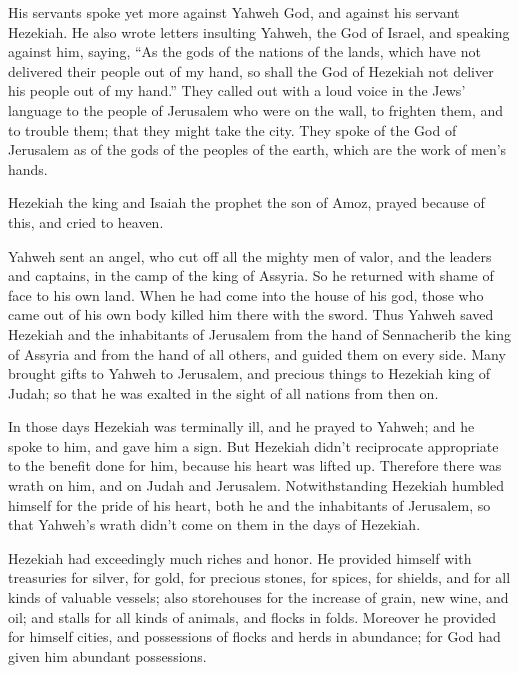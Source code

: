 {\par }{\PP {}His servants spoke yet more against Yahweh God, and against his servant Hezekiah.
He also wrote letters insulting Yahweh, the God of Israel, and speaking against him, saying, “As the gods of the nations of the lands, which have not delivered their people out of my hand, so shall the God of Hezekiah not deliver his people out of my hand.”
They called out with a loud voice in the Jews’ language to the people of Jerusalem who were on the wall, to frighten them, and to trouble them; that they might take the city.
They spoke of the God of Jerusalem as of the gods of the peoples of the earth, which are the work of men’s hands.
\par }{\PP {}Hezekiah the king and Isaiah the prophet the son of Amoz, prayed because of this, and cried to heaven.
\par }{\PP {}Yahweh sent an angel, who cut off all the mighty men of valor, and the leaders and captains, in the camp of the king of Assyria. So he returned with shame of face to his own land. When he had come into the house of his god, those who came out of his own body killed him there with the sword.
Thus Yahweh saved Hezekiah and the inhabitants of Jerusalem from the hand of Sennacherib the king of Assyria and from the hand of all others, and guided them on every side.
Many brought gifts to Yahweh to Jerusalem, and precious things to Hezekiah king of Judah; so that he was exalted in the sight of all nations from then on.
\par }{\PP {}In those days Hezekiah was terminally ill, and he prayed to Yahweh; and he spoke to him, and gave him a sign.
But Hezekiah didn’t reciprocate appropriate to the benefit done for him, because his heart was lifted up. Therefore there was wrath on him, and on Judah and Jerusalem.
Notwithstanding Hezekiah humbled himself for the pride of his heart, both he and the inhabitants of Jerusalem, so that Yahweh’s wrath didn’t come on them in the days of Hezekiah.
\par }{\PP {}Hezekiah had exceedingly much riches and honor. He provided himself with treasuries for silver, for gold, for precious stones, for spices, for shields, and for all kinds of valuable vessels;
also storehouses for the increase of grain, new wine, and oil; and stalls for all kinds of animals, and flocks in folds.
Moreover he provided for himself cities, and possessions of flocks and herds in abundance; for God had given him abundant possessions.
}
